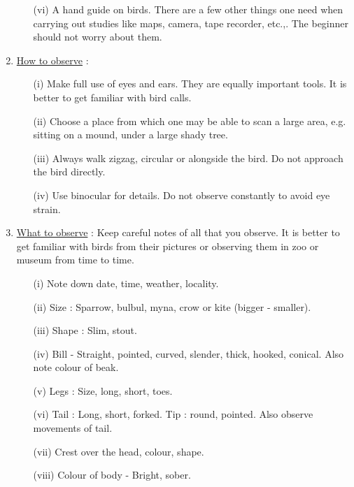 \begin{enumerate}
\begin{itemize}
\item[(vi)] A hand guide on birds. There are a few other things one 
need when carrying out studies like maps, camera, tape 
recorder, etc.,. The beginner should not worry about 
them. 
\end{itemize}

\item \underline{How to observe} :
\begin{itemize}
\item[(i)] Make full use of eyes and ears. They are equally important 
tools. It is better to get familiar with bird calls. 

\item[(ii)] Choose a place from which one may be able to scan a 
large area, e.g. sitting on a mound, under a large 
shady tree. 

\item[(iii)] Always walk zigzag, circular or alongside the bird. Do 
not approach the bird directly. 

\item[(iv)] Use binocular for details. Do not observe constantly to 
avoid eye strain. 
\end{itemize}

\item \underline{What to observe} : Keep careful notes of all that you observe. 
It is better to get familiar with birds from their 
pictures or observing them in zoo or museum from time to 
time. 
\begin{itemize}
\item[(i)] Note down date, time, weather, locality. 

\item[(ii)] Size  : Sparrow, bulbul, myna, crow or kite 
(bigger - smaller). 

\item[(iii)] Shape : Slim, stout. 

\item[(iv)] Bill - Straight, pointed, curved, slender, thick, 
hooked, conical. Also note colour of beak.

\item[(v)] Legs : Size, long, short, toes. 

\item[(vi)] Tail : Long, short, forked. Tip : round, pointed. Also 
observe movements of tail. 

\item[(vii)] Crest over the head, colour, shape. 

\item[(viii)] Colour of body - Bright, sober. 


\end{itemize}
\end{enumerate}
